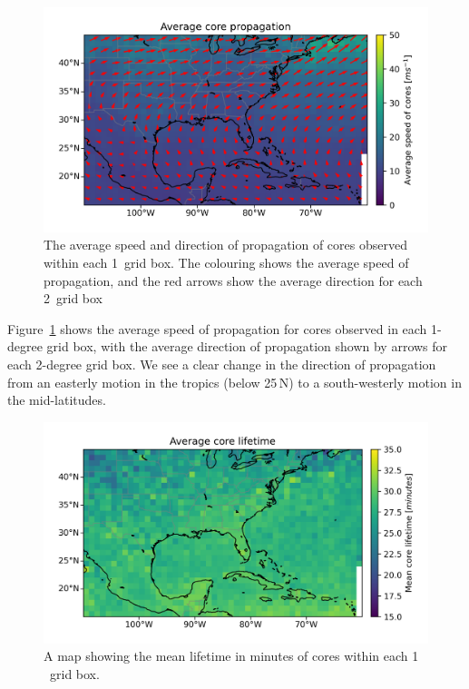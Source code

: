 \begin{figure}[tp]
    \centering
    \includegraphics[width=\textwidth]{figures/chapter2_05.png}
    \caption[
    The average speed and direction of propagation of cores
    ]{
    The average speed and direction of propagation of cores observed within each 1\textdegree\ grid box. The colouring shows the average speed of propagation, and the red arrows show the average direction for each 2\textdegree\ grid box}
    \label{fig:core_propagation_map}
\end{figure}

Figure~\ref{fig:core_propagation_map} shows the average speed of propagation for cores observed in each 1-degree grid box, with the average direction of propagation shown by arrows for each 2-degree grid box.
We see a clear change in the direction of propagation from an easterly motion in the tropics (below 25\,\textdegree N) to a south-westerly motion in the mid-latitudes.

\begin{figure}[tp]
    \centering
    \includegraphics[width=\textwidth]{figures/chapter2_06.png}
    \caption[
    A map showing the mean lifetime in minutes of cores within each 1
    \textdegree\ grid box
    ]{
    A map showing the mean lifetime in minutes of cores within each 1
    \textdegree\ grid box.
    }
    \label{fig:core_lifetime_map}
\end{figure}

